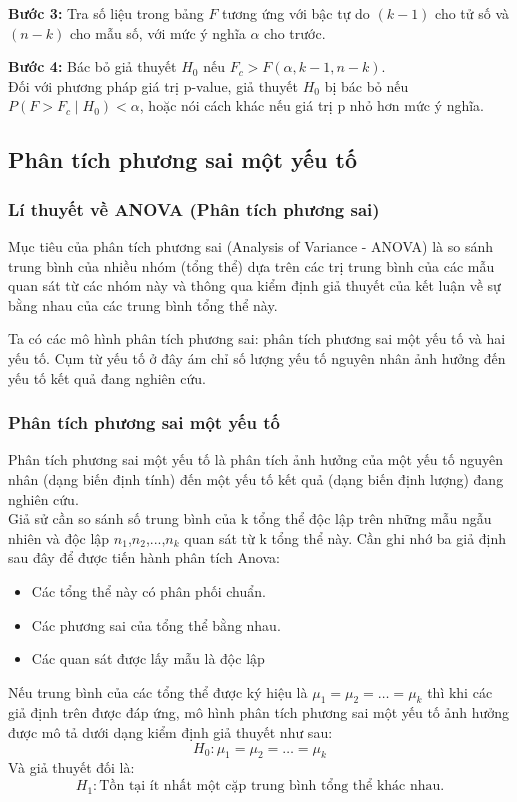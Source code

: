 \textbf{Bước 3:} Tra số liệu trong bảng $F$ tương ứng với bậc tự do $(k-1)$ cho tử số và $(n-k)$ cho mẫu số, với mức ý nghĩa $\alpha$ cho trước.

\textbf{Bước 4:} Bác bỏ giả thuyết $H_0$ nếu $F_c > F(\alpha, k-1, n-k)$. \\
Đối với phương pháp giá trị p-value, giả thuyết $H_0$ bị bác bỏ nếu $P(F > F_c \mid H_0) < \alpha$, hoặc nói cách khác nếu giá trị p nhỏ hơn mức ý nghĩa.
\subsection{Phân tích phương sai một yếu tố}
\subsubsection{Lí thuyết về ANOVA (Phân tích phương sai)}
Mục tiêu của phân tích phương sai (Analysis of Variance - ANOVA) là so sánh trung bình của nhiều nhóm (tổng thể) dựa trên các trị trung bình của các mẫu quan sát từ các nhóm này và thông qua kiểm định giả thuyết của kết luận về sự bằng nhau của các trung bình tổng thể này.

Ta có các mô hình phân tích phương sai: phân tích phương sai một yếu tố và hai yếu tố. Cụm từ yếu tố ở đây ám chỉ số lượng yếu tố nguyên nhân ảnh hưởng đến yếu tố kết quả đang nghiên cứu.
\subsubsection{Phân tích phương sai một yếu tố}
Phân tích phương sai một yếu tố là phân tích ảnh hưởng của một yếu tố nguyên nhân (dạng biến định tính) đến một yếu tố kết quả (dạng biến định lượng) đang nghiên cứu.\\
Giả sử cần so sánh số trung bình của k tổng thể độc lập trên những mẫu ngẫu nhiên và độc lập $n_1$,$n_2$,...,$n_k$ quan sát từ k tổng thể này. Cần ghi nhớ ba giả định sau đây để được tiến hành phân tích Anova:
\begin{itemize}
    \item Các tổng thể này có phân phối chuẩn.
    \item Các phương sai của tổng thể bằng nhau.
    \item Các quan sát được lấy mẫu là độc lập
\end{itemize}

Nếu trung bình của các tổng thể được ký hiệu là $\mu_1 = \mu_2 = \dots = \mu_k$ thì khi các giả định trên được đáp ứng, mô hình phân tích phương sai một yếu tố ảnh hưởng được mô tả dưới dạng kiểm định giả thuyết như sau:
\[
H_0: \mu_1 = \mu_2 = \dots = \mu_k
\]
Và giả thuyết đối là:
\[
H_1: \text{Tồn tại ít nhất một cặp trung bình tổng thể khác nhau.}
\]

